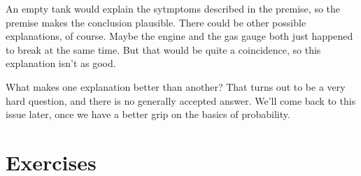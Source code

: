 \documentclass[justified]{tufte-book}
\theoremstyle{definition}
\theoremstyle{definition}
\theoremstyle{definition}
\theoremstyle{remark}
\begin{document}
An empty tank would explain the sytmptoms described in the premise, so the premise makes the conclusion plausible. There could be other possible explanations, of course. Maybe the engine and the gas gauge both just happened to break at the same time. But that would be quite a coincidence, so this explanation isn't as good.

What makes one explanation better than another? That turns out to be a very hard question, and there is no generally accepted answer. We'll come back to this issue later, once we have a better grip on the basics of probability.

\hypertarget{exercises-1}{%
\section*{Exercises}\label{exercises-1}}
\end{document}
